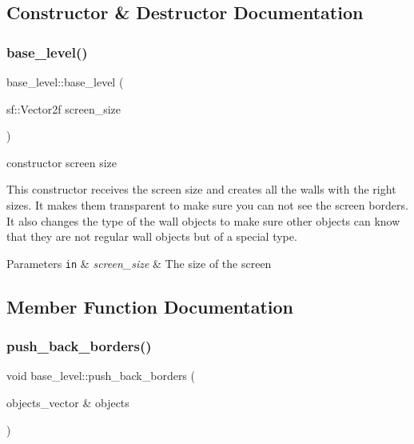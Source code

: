 \subsection{Constructor \& Destructor Documentation}
\mbox{\label{classbase__level_addf165fdc5f4e953be3b6a2dcd00459b}} 
\subsubsection{\texorpdfstring{base\+\_\+level()}{base\_level()}}
{\footnotesize\ttfamily base\+\_\+level\+::base\+\_\+level (\begin{DoxyParamCaption}\item[{sf\+::\+Vector2f}]{screen\+\_\+size }\end{DoxyParamCaption})}



constructor screen size 

This constructor receives the screen size and creates all the walls with the right sizes. It makes them transparent to make sure you can not see the screen borders. It also changes the type of the wall objects to make sure other objects can know that they are not regular wall objects but of a special type. 
\begin{DoxyParams}[1]{Parameters}
\mbox{\tt in}  & {\em screen\+\_\+size} & The size of the screen \\
\hline
\end{DoxyParams}


\subsection{Member Function Documentation}
\mbox{\label{classbase__level_a3b2da28cf45cad434103e81ee6c4538d}} 
\subsubsection{\texorpdfstring{push\+\_\+back\+\_\+borders()}{push\_back\_borders()}}
{\footnotesize\ttfamily void base\+\_\+level\+::push\+\_\+back\+\_\+borders (\begin{DoxyParamCaption}\item[{objects\+\_\+vector \&}]{objects }\end{DoxyParamCaption})}



